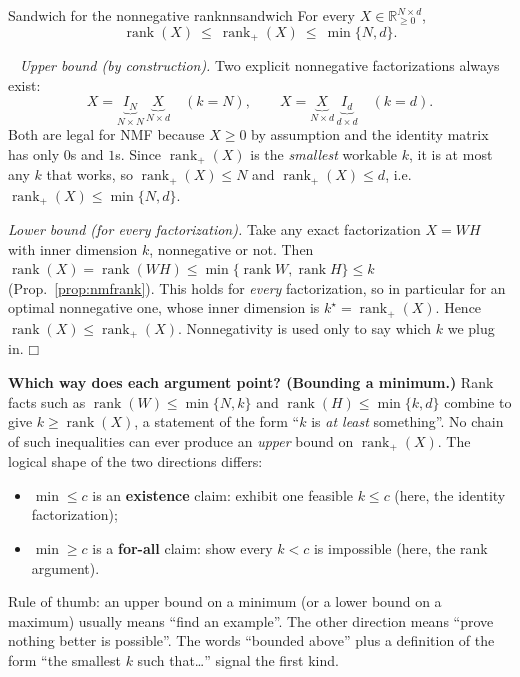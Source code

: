 \documentclass[11pt]{article}
\newenvironment{proofsketch}{\par\noindent{\itshape Proof.}\ }{\hfill$\mdlgwhtsquare$\par}
\newcommand{\R}{\mathbb{R}}
\newcommand{\rank}{\operatorname{rank}}
\begin{document}
\begin{theorem}{Sandwich for the nonnegative rank}{nnsandwich}
For every $X\in\R^{N\times d}_{\ge0}$,
\[
\rank(X)\ \le\ \operatorname{rank}_+(X)\ \le\ \min\{N,d\}.
\]
\end{theorem}
\begin{proofsketch}
\emph{Upper bound (by construction).} Two explicit nonnegative factorizations always exist:
\[
X=\underbrace{I_N}_{N\times N}\,\underbrace{X}_{N\times d}\quad(k=N),
\qquad
X=\underbrace{X}_{N\times d}\,\underbrace{I_d}_{d\times d}\quad(k=d).
\]
Both are legal for NMF because $X\ge0$ by assumption and the identity matrix has only $0$s and
$1$s. Since $\operatorname{rank}_+(X)$ is the \emph{smallest} workable $k$, it is at most any $k$ that works,
so $\operatorname{rank}_+(X)\le N$ and $\operatorname{rank}_+(X)\le d$, i.e.\ $\operatorname{rank}_+(X)\le\min\{N,d\}$.

\emph{Lower bound (for every factorization).} Take any exact factorization $X=WH$ with inner
dimension $k$, nonnegative or not. Then
$\rank(X)=\rank(WH)\le\min\{\rank W,\rank H\}\le k$ (Prop.~\ref{prop:nmfrank}). This holds for
\emph{every} factorization, so in particular for an optimal nonnegative one, whose inner dimension
is $k^\star=\operatorname{rank}_+(X)$. Hence $\rank(X)\le\operatorname{rank}_+(X)$. Nonnegativity is used only to say
which $k$ we plug in.
\end{proofsketch}

\begin{careful}
\textbf{Which way does each argument point? (Bounding a minimum.)} Rank facts such as
$\rank(W)\le\min\{N,k\}$ and $\rank(H)\le\min\{k,d\}$ combine to give $k\ge\rank(X)$, a statement of the form
``$k$ is \emph{at least} something''. No chain of such inequalities can ever produce an \emph{upper}
bound on $\operatorname{rank}_+(X)$. The logical shape of the two directions differs:
\begin{itemize}[nosep]
\item $\min\le c$ is an \textbf{existence} claim: exhibit one feasible $k\le c$ (here, the identity factorization);
\item $\min\ge c$ is a \textbf{for-all} claim: show every $k<c$ is impossible (here, the rank argument).
\end{itemize}
Rule of thumb: an upper bound on a minimum (or a lower bound on a maximum) usually means
``find an example''. The other direction means ``prove nothing better is possible''. The words
``bounded above'' plus a definition of the form ``the smallest $k$ such that\dots'' signal the first kind.
\end{careful}
\end{document}

